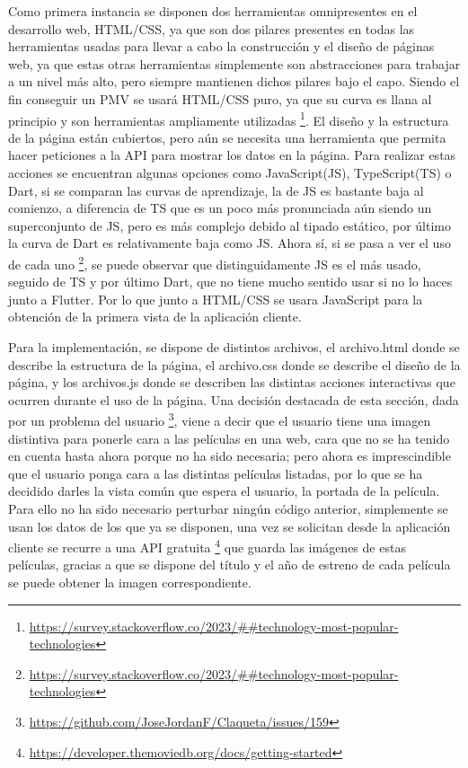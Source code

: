 Como primera instancia se disponen dos herramientas omnipresentes en el desarrollo web, 
HTML\cite{WikiHtml}/CSS\cite{WikiCss}, ya que son dos pilares presentes en todas las herramientas usadas para llevar 
a cabo la construcción y el diseño de páginas web, ya que estas otras herramientas simplemente son abstracciones para 
trabajar a un nivel más alto, pero siempre mantienen dichos pilares bajo el capo. Siendo el fin conseguir un PMV se 
usará HTML/CSS puro, ya que su curva es llana al principio\cite{BookHtmlCss} y son herramientas ampliamente utilizadas
\footnote{\url{https://survey.stackoverflow.co/2023/##technology-most-popular-technologies}}. El diseño y la 
estructura de la página están cubiertos, pero aún se necesita una herramienta que permita hacer peticiones a la API 
para mostrar los datos en la página. Para realizar estas acciones se encuentran algunas opciones como 
JavaScript(JS)\cite{WhatIsJS}, TypeScript(TS)\cite{WhatIsTS} o Dart\cite{WhatIsDart}, si se comparan las curvas de 
aprendizaje, la de JS es bastante baja al comienzo, a diferencia de TS que es un poco más pronunciada aún siendo un 
superconjunto de JS, pero es más complejo debido al tipado estático, por último la curva de Dart es relativamente 
baja como JS. Ahora sí, si se pasa a ver el uso de cada uno 
\footnote{\url{https://survey.stackoverflow.co/2023/##technology-most-popular-technologies}},
se puede observar que distinguidamente JS es el más usado, seguido de TS y por último Dart, que no tiene mucho 
sentido usar si no lo haces junto a Flutter. Por lo que junto a HTML/CSS se usara JavaScript para la obtención de la 
primera vista de la aplicación cliente.

Para la implementación, se dispone de distintos archivos, el archivo.html donde se describe la estructura de la 
página, el archivo.css donde se describe el diseño de la página, y los archivos.js donde se describen las distintas 
acciones interactivas que ocurren durante el uso de la página. Una decisión destacada de esta sección, dada por un 
problema del usuario \footnote{\url{https://github.com/JoseJordanF/Claqueta/issues/159}}, viene a decir que el 
usuario tiene una imagen distintiva para ponerle cara a las películas en una web, cara que no se ha tenido en cuenta 
hasta ahora porque no ha sido necesaria; pero ahora es imprescindible que el usuario ponga cara a las distintas 
películas listadas, por lo que se ha decidido darles la vista común que espera el usuario, la portada de la 
película. Para ello no ha sido necesario perturbar ningún código anterior, simplemente se usan los datos de los que 
ya se disponen, una vez se solicitan desde la aplicación cliente se recurre a una API gratuita
\footnote{\url{https://developer.themoviedb.org/docs/getting-started}} que guarda las imágenes de estas películas, 
gracias a que se dispone del título y el año de estreno de cada película se puede obtener la imagen correspondiente.

